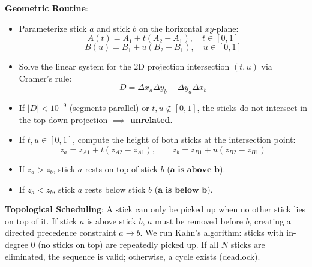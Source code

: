 \documentclass[12pt]{article}
\begin{document}
\textbf{Geometric Routine}:
\begin{itemize}
    \item Parameterize stick $a$ and stick $b$ on the horizontal $xy$-plane:
    \[
    A(t) = A_1 + t(A_2 - A_1), \quad t \in [0, 1]
    \]
    \[
    B(u) = B_1 + u(B_2 - B_1), \quad u \in [0, 1]
    \]
    \item Solve the linear system for the 2D projection intersection $(t, u)$ via Cramer's rule:
    \[
    D = \Delta x_a \Delta y_b - \Delta y_a \Delta x_b
    \]
    \item If $|D| < 10^{-9}$ (segments parallel) or $t, u \notin [0, 1]$, the sticks do not intersect in the top-down projection $\implies$ \textbf{unrelated}.
    \item If $t, u \in [0, 1]$, compute the height of both sticks at the intersection point:
    \[
    z_a = z_{A1} + t(z_{A2} - z_{A1}), \qquad z_b = z_{B1} + u(z_{B2} - z_{B1})
    \]
    \item If $z_a > z_b$, stick $a$ rests on top of stick $b$ ($\mathbf{a \text{ is above } b}$).
    \item If $z_a < z_b$, stick $a$ rests below stick $b$ ($\mathbf{a \text{ is below } b}$).
\end{itemize}

\textbf{Topological Scheduling}:
A stick can only be picked up when no other stick lies on top of it. If stick $a$ is above stick $b$, $a$ must be removed before $b$, creating a directed precedence constraint $a \to b$. We run Kahn's algorithm: sticks with in-degree 0 (no sticks on top) are repeatedly picked up. If all $N$ sticks are eliminated, the sequence is valid; otherwise, a cycle exists (deadlock).
\end{document}
